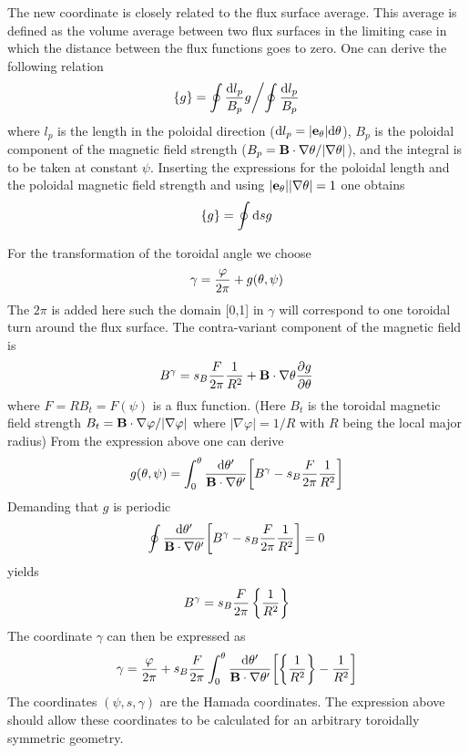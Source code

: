 The new coordinate is closely related to the flux surface average. This average is defined 
as the volume average between two flux surfaces in the limiting case in which the distance between 
the flux functions goes to zero. One can derive the following relation  
\begin{equation} 
\{ g \} = \oint {{\rm d} l_p \over B_p } g \biggl / \oint {{\rm d} l_p \over B_p }
\end{equation}
where $l_p$ is the length in the poloidal direction (${\rm d}l_p = \vert {\bf e}_\theta \vert 
{\rm d} \theta$), $B_p$ is the poloidal component of the magnetic field strength ($B_p = 
{\bf B}\cdot \nabla \theta / \vert \nabla \theta \vert$), and the integral is to be taken at 
constant $\psi$. Inserting the expressions for the 
poloidal length and the poloidal magnetic field strength and using $\vert {\bf e}_\theta\vert 
\vert \nabla \theta \vert = 1$ one obtains 
\begin{equation} 
\{ g \} = \oint {\rm d}s g 
\end{equation} 


For the transformation of the toroidal angle we choose 
\begin{equation} 
\gamma = {\varphi \over 2 \pi} + g(\theta,\psi) 
\end{equation}
The $2\pi$ is added here such the domain [0,1] in $\gamma$ will correspond to one toroidal 
turn around the flux surface. The contra-variant component of the magnetic field is 
\begin{equation} 
B^\gamma = s_B {F \over 2\pi} {1\over R^2} + {\bf B} \cdot \nabla \theta {\partial g \over \partial 
\theta} 
\end{equation} 
where $F = R B_t = F(\psi)$ is a flux function. (Here $B_t$ is the toroidal magnetic field 
strength $B_t = {\bf B} \cdot \nabla \varphi / \vert \nabla \varphi \vert$ where $\vert \nabla \varphi 
\vert = 1/R$ with $R$ being the local major radius)
From the expression above one can derive 
\begin{equation} 
g(\theta,\psi) = \int_0^\theta {{\rm d}\theta^\prime \over {\bf B}\cdot \nabla \theta^\prime } 
\biggl [ B^\gamma - s_B{F \over 2\pi} {1 \over R^2} \biggr ] 
\end{equation} 
Demanding that $g$ is periodic
\begin{equation}
\oint {{\rm d}\theta^\prime \over {\bf B}\cdot 
\nabla \theta^\prime } 
\biggl [ B^\gamma - s_B{F \over 2\pi} {1 \over R^2} \biggr ] =0
\end{equation}
yields 
\begin{equation} 
B^\gamma = s_B {F\over 2 \pi }  \left \{ {1\over R^2} \right \} 
\end{equation} 
The coordinate $\gamma$ can then be expressed as 
\begin{equation} 
\gamma = {\varphi \over 2\pi} + s_B {F \over 2\pi} \int_0^\theta {{\rm d} \theta^\prime \over {\bf B}
\cdot \nabla \theta^\prime} \biggl [ \left \{ {1\over R^2} \right \} - {1\over R^2} 
\biggr ] 
\end{equation} 
The coordinates $(\psi,s,\gamma)$ are the Hamada coordinates. The expression above should 
allow these coordinates to be calculated for an arbitrary toroidally symmetric geometry. 


